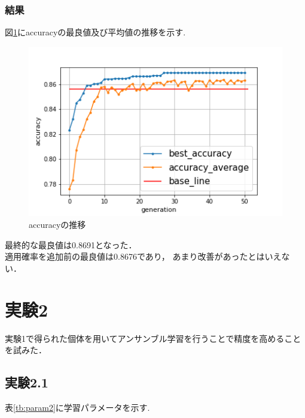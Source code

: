 \documentclass[twocolumn]{jarticle}     %
\begin{document}
\subsubsection{結果}
図\ref{fig:graph1}にaccuracyの最良値及び平均値の推移を示す.
\begin{figure}[hp]
	\centering
	\includegraphics[scale=0.6]{graph.png}
	\caption{accuracyの推移\label{fig:graph1}}
\end{figure}
最終的な最良値は0.8691となった．\\
適用確率を追加前の最良値は0.8676であり，
あまり改善があったとはいえない．

\section{実験2}
実験1で得られた個体を用いてアンサンブル学習を行うことで精度を高めることを試みた．

\subsection{実験2.1}
表\ref{tb:param2}に学習パラメータを示す.
\end{document}
